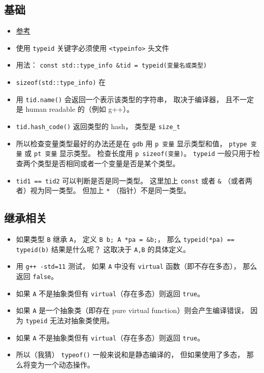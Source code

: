 
\begin{issues}
\issueDraft
\end{issues}

\subsection{基础}
\begin{itemize}
\item \href{https://en.cppreference.com/w/cpp/language/typeid}{参考}
\item 使用 \verb|typeid| 关键字必须使用 \verb|<typeinfo>| 头文件
\item 用法： \verb|const std::type_info &tid = typeid(变量名或类型)|
\item \verb`sizeof(std::type_info)` 在
\item 用 \verb|tid.name()| 会返回一个表示该类型的字符串， 取决于编译器， 且不一定是 human readable 的（例如 g++）。
\item \verb|tid.hash_code()| 返回类型的 hash， 类型是 \verb|size_t|
\item 所以检查变量类型最好的办法还是在 \verb|gdb| 用 \verb|p 变量| 显示类型和值， \verb|ptype 变量| 或 \verb|pt 变量| 显示类型。 检查长度用 \verb|p sizeof(变量)|。 \verb|typeid| 一般只用于检查两个类型是否相同或者一个变量是否是某个类型。
\item \verb|tid1 == tid2| 可以判断是否是同一类型。 这里加上 \verb|const| 或者 \verb|&| （或者两者）视为同一类型。 但加上 \verb|*| （指针）不是同一类型。
\end{itemize}

\subsection{继承相关}
\begin{itemize}
\item 如果类型 \verb|B| 继承 \verb|A|， 定义 \verb|B b; A *pa = &b;|， 那么 \verb|typeid(*pa) == typeid(b)| 结果是什么呢？ 这取决于 \verb|A,B| 的具体定义。
\item 用 \verb|g++ -std=11| 测试， 如果 \verb|A| 中没有 \verb|virtual| 函数（即不存在多态）， 那么返回 \verb|false|。
\item 如果 \verb|A| 不是抽象类但有 \verb|virtual|（存在多态）则返回 \verb|true|。
\item 如果 \verb|A| 是一个抽象类（即存在 pure virtual function）则会产生编译错误， 因为 \verb|typeid| 无法对抽象类使用。
\item 如果 \verb|A| 不是抽象类但有 \verb|virtual|（存在多态）则返回 \verb|true|。
\item 所以（我猜） \verb|typeof()| 一般来说和是静态编译的， 但如果使用了多态， 那么将变为一个动态操作。
\end{itemize}
